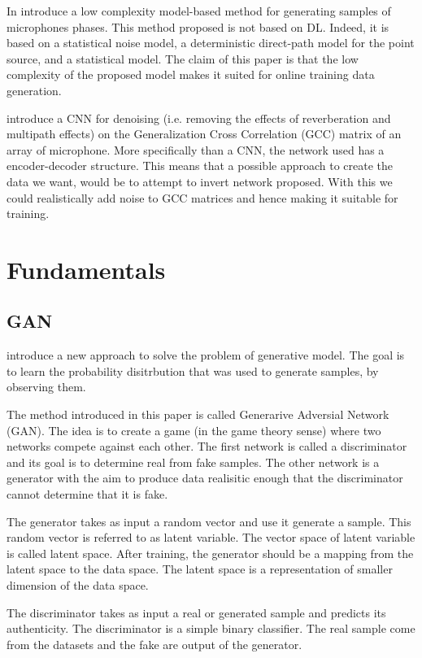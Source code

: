 \documentclass{article}
\begin{document}
In \cite{hubner2021efficient} introduce a low complexity model-based method for generating samples of microphones phases. This method proposed is not based on DL. Indeed, it is based on a statistical noise model, a deterministic direct-path model for the point source, and a statistical model. The claim of this paper is that the low complexity of the proposed  model makes it suited for online training data generation. 

\cite{vera2021acoustic} introduce a CNN for denoising (i.e. removing the effects of reverberation and multipath effects) on the Generalization Cross Correlation (GCC) matrix of an array of microphone. More specifically than a CNN, the network used has a encoder-decoder structure. This means that a possible approach to create the data we want, would be to attempt to invert network proposed. With this we could realistically add noise to GCC matrices and hence making it suitable for training.

\section{Fundamentals}


\subsection{GAN}

\cite{goodfellow2020generative} introduce a new approach to solve the problem of generative model. The goal is to learn the probability disitrbution that was used to generate samples, by observing them.

The method introduced in this paper is called Generarive Adversial Network (GAN). The idea is to create a game (in the game theory sense) where two networks compete against each other. The first network is called a discriminator and its goal is to determine real from fake samples. The other network is a  generator with the aim to produce data realisitic enough that the discriminator cannot determine that it is fake.

The generator takes as input a random vector and use it generate a sample. This random vector is referred to as latent variable. The vector space of latent variable is called latent space. After training, the generator should be a mapping from the latent space to the data space. The latent space is  a representation of smaller dimension of the data space.

The discriminator takes as input a real or generated sample and predicts its authenticity. The discriminator is a simple binary classifier. The real sample come from the datasets and the fake are output of the generator.
\end{document}
